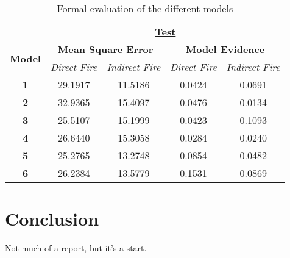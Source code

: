 \documentclass[a4paper,11pt]{report}
\begin{document}
\begin{table}[]
\centering
\caption{Formal evaluation of the different models}
\label{model-comparison}
\begin{tabular}{ccccc}
\multicolumn{1}{l}{}                                       & \multicolumn{4}{c}{{\ul \textbf{Test}}}                                                                                                                                           \\
\multicolumn{1}{c|}{\multirow{2}{*}{{\ul \textbf{Model}}}} & \multicolumn{2}{c|}{\textbf{Mean Square Error}}                                         & \multicolumn{2}{c}{\textbf{Model Evidence}}                                                         \\
\multicolumn{1}{c|}{}                                      & \multicolumn{1}{c|}{\textit{Direct Fire}} & \multicolumn{1}{c|}{\textit{Indirect Fire}} & \multicolumn{1}{c|}{\textit{Direct Fire}} & \multicolumn{1}{c}{\textit{Indirect Fire}} \\ \hline
\multicolumn{1}{c|}{\textbf{1}}                    & \multicolumn{1}{c|}{29.1917}              & \multicolumn{1}{c|}{11.5186}                & \multicolumn{1}{c|}{0.0424}               & \multicolumn{1}{c}{0.0691}                 \\ \hline
\multicolumn{1}{c|}{\textbf{2}}            & \multicolumn{1}{c|}{32.9365}              & \multicolumn{1}{c|}{15.4097}                & \multicolumn{1}{c|}{0.0476}               & \multicolumn{1}{c}{0.0134}                 \\ \hline
\multicolumn{1}{c|}{\textbf{3}}    & \multicolumn{1}{c|}{25.5107}              & \multicolumn{1}{c|}{15.1999}                & \multicolumn{1}{c|}{0.0423}               & \multicolumn{1}{c}{0.1093}                 \\ \hline
\multicolumn{1}{c|}{\textbf{4}}            & \multicolumn{1}{c|}{26.6440}              & \multicolumn{1}{c|}{15.3058}                & \multicolumn{1}{c|}{0.0284}               & \multicolumn{1}{c}{0.0240}                 \\ \hline
\multicolumn{1}{c|}{\textbf{5}}    & \multicolumn{1}{c|}{25.2765}              & \multicolumn{1}{c|}{13.2748}                & \multicolumn{1}{c|}{0.0854}               & \multicolumn{1}{c}{0.0482}                 \\ \hline
\multicolumn{1}{c|}{\textbf{6}}    & \multicolumn{1}{c|}{26.2384}              & \multicolumn{1}{c|}{13.5779}                & \multicolumn{1}{c|}{0.1531}               & \multicolumn{1}{c}{0.0869}                 \\ \hline
\end{tabular}
\end{table}



\chapter{Conclusion}
Not much of a report, but it's a start.


\singlespacing 

\newpage



\end{document}
